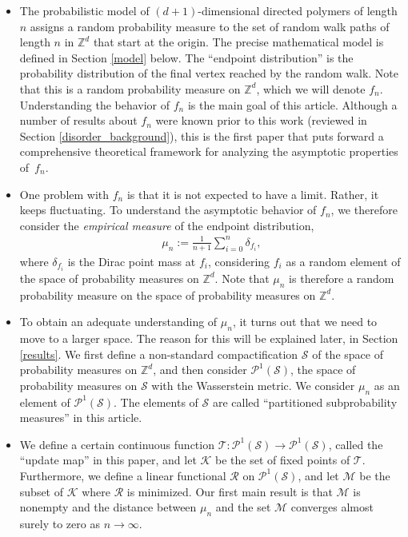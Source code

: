\documentclass[11pt,reqno]{amsart}
\numberwithin{equation}{section}
\theoremstyle{definition}
\begin{document}
\begin{itemize}
\item The probabilistic model of $(d+1)$-dimensional directed polymers of length $n$ assigns a random probability measure to the set of random walk paths of length $n$ in ${\mathbb{Z}}^d$ that start at the origin. The precise mathematical model is defined in Section \ref{model} below. The ``endpoint distribution'' is the probability distribution of the final vertex reached by the random walk. Note that this is a random probability measure on ${\mathbb{Z}}^d$, which we will denote $f_n$. Understanding the  behavior of $f_n$ is the main goal of this article. Although a number of results about $f_n$ were known prior to this work (reviewed in  Section \ref{disorder_background}), this is the first paper that puts forward a comprehensive theoretical framework for analyzing the asymptotic properties of~$f_n$.
\item One problem with $f_n$ is that it is not expected to have a limit. Rather, it keeps fluctuating. To understand the asymptotic behavior of $f_n$, we therefore consider the {\it empirical measure} of the endpoint distribution,
{\begin{align*} {
\mu_n := \frac{1}{n+1}\sum_{i=0}^n \delta_{f_i},
} \end{align*}}
where $\delta_{f_i}$ is the Dirac point mass at $f_i$, considering $f_i$ as a random element of the space of probability measures on ${\mathbb{Z}}^d$. Note that $\mu_n$ is therefore a random probability measure on the space of probability measures on ${\mathbb{Z}}^d$. 
\item To obtain an adequate understanding of $\mu_n$, it turns out that we need to move to a larger space. The reason for this will be explained later, in Section \ref{results}. We first define a non-standard compactification ${\mathcal{S}}$ of the space of probability measures on ${\mathbb{Z}}^d$, and then consider ${\mathcal{P}}^1({\mathcal{S}})$, the space of probability measures on ${\mathcal{S}}$ with the Wasserstein metric. We consider $\mu_n$ as an element of ${\mathcal{P}}^1({\mathcal{S}})$. The elements of ${\mathcal{S}}$ are called ``partitioned subprobability measures'' in this article.
\item We define a certain continuous function ${\mathcal{T}} :{\mathcal{P}}^1({\mathcal{S}})\to {\mathcal{P}}^1({\mathcal{S}})$, called the ``update map'' in this paper, and let ${\mathcal{K}}$ be the set of fixed points of ${\mathcal{T}}$. Furthermore, we define a linear functional ${\mathcal{R}}$ on ${\mathcal{P}}^1({\mathcal{S}})$, and let ${\mathcal{M}}$ be the subset of ${\mathcal{K}}$ where ${\mathcal{R}}$ is minimized. Our first main result is that ${\mathcal{M}}$ is nonempty and the distance between $\mu_n$ and the set ${\mathcal{M}}$ converges almost surely to zero as $n\to \infty$. 

\end{itemize}
\end{document}
